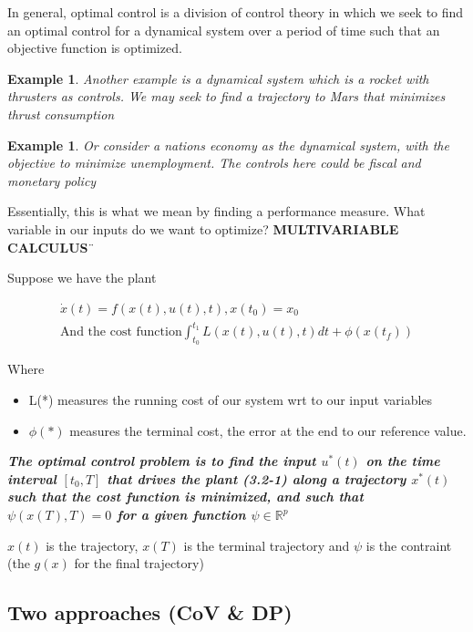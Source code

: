 \documentclass[11pt, a4paper]{article} %
\newtheorem{example}[theorem]{Example}
\begin{document}
In general, optimal control is a division of control theory in which we seek to find an optimal control for a dynamical system over a period of time such that an objective function is optimized.

\begin{example}
    Another example is a dynamical system which is a rocket with thrusters as controls. We may seek to find a trajectory to Mars that minimizes thrust consumption
\end{example}

\begin{example}
    Or consider a nations economy as the dynamical system, with the objective to minimize unemployment. The controls here could be fiscal and monetary policy
\end{example}



Essentially, this is what we mean by finding a performance measure. What variable in our inputs do we want to optimize? \textbf{MULTIVARIABLE CALCULUS}¨

Suppose we have the plant

\begin{align*}
    \dot{x}(t) = f(x(t), u(t), t), x(t_0)=x_0 \\
    \text{And the cost function} \int_{t_0}^{t_1}L(x(t), u(t), t) dt + \phi(x(t_f))
\end{align*}


Where
\begin{itemize}
    \item L(*) measures the running cost of our system wrt to our input variables
    \item $ \phi(*) $ measures the terminal cost, the error at the end to our reference value.
\end{itemize}

\textbf{\textit{The optimal control problem is to find the input $u^*(t)$ on the time interval $\left[t_0, T\right]$ that drives the plant (3.2-1) along a trajectory $x^*(t) $ such that the cost function  is minimized, and such that
$\psi(x(T), T ) = 0$ for a given function $ \psi \in \mathbb{R}^p $ }}

$ x(t) $ is the trajectory, $ x(T) $ is the terminal trajectory and $ \psi $ is the contraint (the $ g(x) $ for the final trajectory)  


\subsection{Two approaches (CoV \& DP)}
\end{document}
